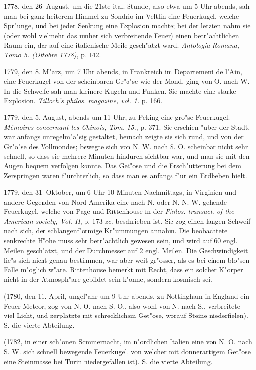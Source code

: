 \documentclass[a4paper, 11pt, oneside, polutonikogreek, german]{article}
\begin{document}
1778, den 26. August, um die 21ste ital. Stunde, also etwa um 5 Uhr abends, sah man bei ganz heiterem Himmel zu Sondrio im Veltlin eine Feuerkugel, welche Spr"unge, und bei jeder Senkung eine Explosion machte; bei der letzten nahm sie (oder wohl vielmehr das umher sich verbreitende Feuer) einen betr"achtlichen Raum ein, der auf eine italienische Meile gesch"atzt ward. \emph{Antologia Romana, Tomo 5. (Ottobre 1778)}, p. 142.

1779, den 8. M"arz, um 7 Uhr abends, in Frankreich im Departement de l'Ain, eine Feuerkugel von der scheinbaren Gr"o"se wie der Mond, ging von O. nach W. In die Schweife sah man kleinere Kugeln und Funken. Sie machte eine starke Explosion. \emph{Tilloch's philos. magazine, vol. 1.} p. 166.

1779, den 5. August, abends um 11 Uhr, zu Peking eine gro"se Feuerkugel. \emph{Mémoires concernant les Chinois, Tom. 15.}, p. 371. Sie erschien "uber der Stadt, war anfangs unregelm"a"sig gestaltet, hernach zeigte sie sich rund, und von der Gr"o"se des Vollmondes; bewegte sich von N. W. nach S. O. scheinbar nicht sehr schnell, so dass sie mehrere Minuten hindurch sichtbar war, und man sie mit den Augen bequem verfolgen konnte. Das Get"ose und die Ersch"utterung bei dem Zerspringen waren f"urchterlich, so dass man es anfangs f"ur ein Erdbeben hielt.

1779, den 31. Oktober, um 6 Uhr 10 Minuten Nachmittags, in Virginien und andere Gegenden von Nord-Amerika eine nach N. oder N. N. W. gehende Feuerkugel, welche von Page und Rittenhouse in der \emph{Philos. transact. of the American society, Vol. II}, p. 173 \emph{zc.} beschrieben ist. Sie zog einen langen Schweif nach sich, der schlangenf"ormige Kr"ummungen annahm. Die beobachtete senkrechte H"ohe muss sehr betr"achtlich gewesen sein, und wird auf 60 engl. Meilen gesch"atzt, und der Durchmesser auf 2 engl. Meilen. Die Geschwindigkeit lie"s sich nicht genau bestimmen, war aber weit gr"osser, als es bei einem blo"sen Falle m"oglich w"are. Rittenhouse bemerkt mit Recht, dass ein solcher K"orper nicht in der Atmosph"are gebildet sein k"onne, sondern kosmisch sei.

(1780, den 11. April, ungef"ahr um 9 Uhr abends, zu Nottingham in England ein Feuer-Meteor, zog von N. O. nach S. O., also wohl von N. nach S., verbreitete viel Licht, und zerplatzte mit schrecklichem Get"ose, worauf Steine niederfielen). S. die vierte Abteilung.

(1782, in einer sch"onen Sommernacht, im n"ordlichen Italien eine von N. O. nach S. W. sich schnell bewegende Feuerkugel, von welcher mit donnerartigem Get"ose eine Steinmasse bei Turin niedergefallen ist). S. die vierte Abteilung.
\end{document}
